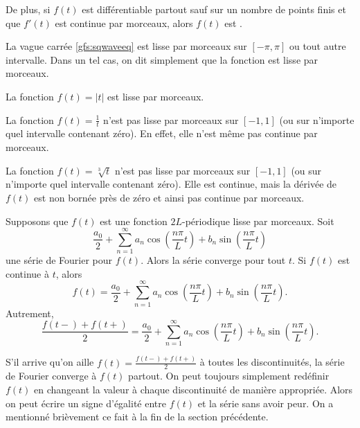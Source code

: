 De plus, si $f(t)$ est différentiable partout sauf sur un nombre de points finis et que $f'(t)$ est continue par morceaux, alors
$f(t)$ est \emph{}.

\begin{example}
La vague carrée \eqref{gfs:sqwaveeq}
est lisse par morceaux sur  $[-\pi,\pi]$ ou tout autre intervalle. Dans un tel cas, on dit simplement que la fonction est lisse par morceaux.  
\end{example}

\begin{example}
La fonction $f(t) = \lvert t \lvert$
est lisse par morceaux.
\end{example}

\begin{example}
La fonction $f(t) = \frac{1}{t}$ n'est pas lisse par morceaux sur 
$[-1,1]$ (ou sur n'importe quel intervalle contenant zéro). En effet, elle n'est même pas continue par morceaux. 
\end{example}

\begin{example}
La fonction $f(t) = \sqrt[3]{t}$ n'est pas lisse par morceaux sur 
$[-1,1]$ (ou sur n'importe quel intervalle contenant zéro).  Elle est continue, mais la dérivée de $f(t)$ est non bornée près de zéro et ainsi pas continue par morceaux. 
\end{example}

\begin{theorem}
Supposons que  $f(t)$ est une fonction $2L$-périodique lisse par morceaux.
Soit
\begin{equation*}
\frac{a_0}{2} + \sum_{n=1}^\infty a_n \cos \left( \frac{n \pi}{L} t
\right)
+ b_n \sin \left( \frac{n \pi}{L} t \right)
\end{equation*}
une série de Fourier pour $f(t)$.  Alors la série converge pour tout $t$.  Si $f(t)$ est continue à $t$,  alors
\begin{equation*}
f(t) = \frac{a_0}{2} + \sum_{n=1}^\infty
a_n \cos \left( \frac{n \pi}{L} t \right)
+ b_n \sin \left( \frac{n \pi}{L} t \right) .
\end{equation*}
Autrement,
\begin{equation*}
\frac{f(t-)+f(t+)}{2} =
\frac{a_0}{2} + \sum_{n=1}^\infty a_n \cos \left( \frac{n \pi}{L}  t
\right)
+ b_n \sin \left( \frac{n \pi}{L} t \right) .
\end{equation*}
\end{theorem}

S'il arrive qu'on aille
$f(t) = \frac{f(t-)+f(t+)}{2}$ à toutes les discontinuités, la série de Fourier converge à  $f(t)$ partout. On peut toujours simplement redéfinir $f(t)$ en changeant la valeur à chaque discontinuité de manière appropriée. Alors on peut écrire un  signe d'égalité entre $f(t)$ et la série sans avoir peur. On a mentionné  brièvement ce fait à la fin de la section précédente. 

